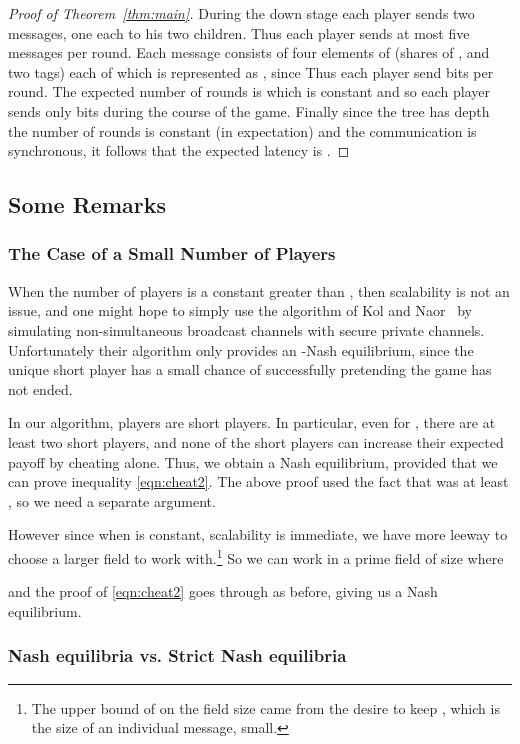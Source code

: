\documentclass[12pt]{article}
\theoremstyle{definition}
\begin{document}
\begin{proof}[Proof of Theorem~\ref{thm:main}]
During the down stage each player sends two messages, one each 
to his two children. Thus each player sends at most five messages per round.
Each message consists of four elements of  (shares of ,  and 
two tags) each of which is represented as , since 
Thus each player send  bits per round. 
The expected number of rounds is  which is constant 
and so each player sends only  bits 
during the course of the game. Finally since the tree has depth
 the number of rounds is constant (in expectation) and the 
communication is synchronous, it follows that the expected
latency is .
\end{proof}

\subsection{Some Remarks}
\subsubsection{The Case of a Small Number of Players}\label{sec:smalln}
When the number of players is a constant greater than , then 
scalability is not an issue, and one might hope to simply use the algorithm of 
Kol and Naor~\cite{kol2008games} by simulating non-simultaneous broadcast 
channels with secure private channels. Unfortunately their algorithm only 
provides an -Nash equilibrium, since the unique short player 
has a small chance of successfully pretending the game has not ended. 

In our algorithm,  players are short players. In particular,
even for , there are at least two short players, and none of the short 
players can increase their expected payoff by cheating alone. Thus, we 
obtain a Nash equilibrium, provided that we can prove inequality \eqref{eqn:cheat2}. 
The above proof used the fact that  was at least 
, so we need a separate argument.

However  since when  is constant, scalability is immediate, we have more leeway to 
choose a larger field to work with.\footnote{The upper bound of  on the field 
size came from the desire to keep , which is the size of an individual 
message, small.} So we can work in a prime field of size  where 

and the proof of  \eqref{eqn:cheat2} goes through as before, giving us a Nash 
equilibrium.


\subsubsection{Nash equilibria vs. Strict Nash equilibria}
\end{document}
